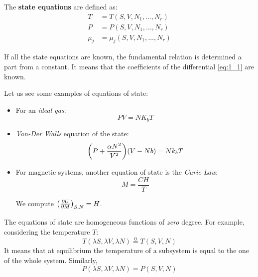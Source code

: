 \documentclass[../main/main.tex]{subfiles}
\begin{document}
 The \textbf{state equations} are defined as:
\begin{subequations}
\begin{align}
  T &= T (S,V,N_1,\dots,N_r) \\
  P &= P (S,V,N_1,\dots,N_r) \\
  \mu _j &= \mu _j (S,V,N_1,\dots,N_r)
\end{align}
\label{}
\end{subequations}
\begin{remark}
If all the state equations are known, the fundamental relation is determined a part from a constant. It means that the coefficients of the differential \eqref{eq:1_1} are known.
\end{remark}
\begin{example}{}{}
Let us see some examples of equations of state:
\begin{itemize}
\item For an \emph{ideal gas}:
\begin{equation}
  P V = N K_b T
\end{equation}
\item \emph{Van-Der Walls} equation of the state:
\begin{equation}
  \qty(P+\frac{\alpha N^2}{V^2})\qty(V-Nb) = N k_b T
\end{equation}
\item For magnetic systems, another equation of state is the \emph{Curie Law}:
\begin{equation}
M=\frac{C H}{T}
\end{equation}
\begin{remark}
We compute \( \qty(\pdv{U}{M} )_{S,N}=H  \).
\end{remark}
\end{itemize}
\end{example}

The equations of state are homogeneous functions of \emph{zero} degree. For example, considering the temperature \( T \):
\begin{equation*}
  T (\lambda S, \lambda V, \lambda N) \overset{0}{=} T (S,V,N)
\end{equation*}
It means that at equilibrium the temperature of a subsystem is equal to the one of the whole system.
Similarly,
\begin{equation*}
  P (\lambda S, \lambda V, \lambda N) = P (S,V,N)
\end{equation*}
\end{document}
